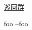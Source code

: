 \documentclass{jsarticle}
\begin{document}
\href{https://ja.wikipedia.org/wiki/%E5%B7%A1%E5%9B%9E%E7%BE%A4}{巡回群}

foo \sim foo
\end{document}
